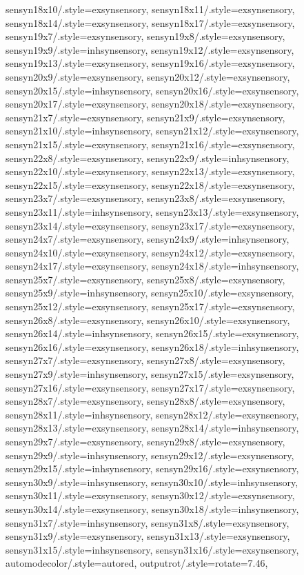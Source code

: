 {sensyn18x10/.style={exsynsensory},
sensyn18x11/.style={exsynsensory},
sensyn18x14/.style={exsynsensory},
sensyn18x17/.style={exsynsensory},
sensyn19x7/.style={exsynsensory},
sensyn19x8/.style={exsynsensory},
sensyn19x9/.style={inhsynsensory},
sensyn19x12/.style={exsynsensory},
sensyn19x13/.style={exsynsensory},
sensyn19x16/.style={exsynsensory},
sensyn20x9/.style={exsynsensory},
sensyn20x12/.style={exsynsensory},
sensyn20x15/.style={inhsynsensory},
sensyn20x16/.style={exsynsensory},
sensyn20x17/.style={exsynsensory},
sensyn20x18/.style={exsynsensory},
sensyn21x7/.style={exsynsensory},
sensyn21x9/.style={exsynsensory},
sensyn21x10/.style={inhsynsensory},
sensyn21x12/.style={exsynsensory},
sensyn21x15/.style={exsynsensory},
sensyn21x16/.style={exsynsensory},
sensyn22x8/.style={exsynsensory},
sensyn22x9/.style={inhsynsensory},
sensyn22x10/.style={exsynsensory},
sensyn22x13/.style={exsynsensory},
sensyn22x15/.style={exsynsensory},
sensyn22x18/.style={exsynsensory},
sensyn23x7/.style={exsynsensory},
sensyn23x8/.style={exsynsensory},
sensyn23x11/.style={inhsynsensory},
sensyn23x13/.style={exsynsensory},
sensyn23x14/.style={exsynsensory},
sensyn23x17/.style={exsynsensory},
sensyn24x7/.style={exsynsensory},
sensyn24x9/.style={inhsynsensory},
sensyn24x10/.style={exsynsensory},
sensyn24x12/.style={exsynsensory},
sensyn24x17/.style={exsynsensory},
sensyn24x18/.style={inhsynsensory},
sensyn25x7/.style={exsynsensory},
sensyn25x8/.style={exsynsensory},
sensyn25x9/.style={inhsynsensory},
sensyn25x10/.style={exsynsensory},
sensyn25x12/.style={exsynsensory},
sensyn25x17/.style={exsynsensory},
sensyn26x8/.style={exsynsensory},
sensyn26x10/.style={exsynsensory},
sensyn26x14/.style={inhsynsensory},
sensyn26x15/.style={exsynsensory},
sensyn26x16/.style={exsynsensory},
sensyn26x18/.style={inhsynsensory},
sensyn27x7/.style={exsynsensory},
sensyn27x8/.style={exsynsensory},
sensyn27x9/.style={inhsynsensory},
sensyn27x15/.style={exsynsensory},
sensyn27x16/.style={exsynsensory},
sensyn27x17/.style={exsynsensory},
sensyn28x7/.style={exsynsensory},
sensyn28x8/.style={exsynsensory},
sensyn28x11/.style={inhsynsensory},
sensyn28x12/.style={exsynsensory},
sensyn28x13/.style={exsynsensory},
sensyn28x14/.style={inhsynsensory},
sensyn29x7/.style={exsynsensory},
sensyn29x8/.style={exsynsensory},
sensyn29x9/.style={inhsynsensory},
sensyn29x12/.style={exsynsensory},
sensyn29x15/.style={inhsynsensory},
sensyn29x16/.style={exsynsensory},
sensyn30x9/.style={inhsynsensory},
sensyn30x10/.style={inhsynsensory},
sensyn30x11/.style={exsynsensory},
sensyn30x12/.style={exsynsensory},
sensyn30x14/.style={exsynsensory},
sensyn30x18/.style={inhsynsensory},
sensyn31x7/.style={inhsynsensory},
sensyn31x8/.style={exsynsensory},
sensyn31x9/.style={exsynsensory},
sensyn31x13/.style={exsynsensory},
sensyn31x15/.style={inhsynsensory},
sensyn31x16/.style={exsynsensory},
automodecolor/.style={autored},
outputrot/.style={rotate=7.46},
}
